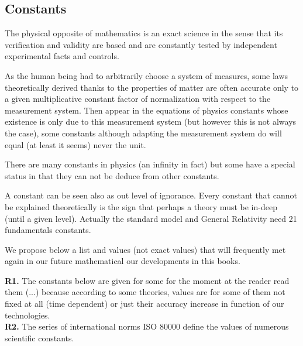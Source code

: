 	\subsection{Constants}
	The physical opposite of mathematics is an exact science in the sense that its verification and validity are based and are constantly tested by independent experimental facts and controls.

	As the human being had to arbitrarily choose a system of measures, some laws theoretically derived thanks to the properties of matter are often accurate only to a given multiplicative constant factor of normalization with respect to the measurement system. Then appear in the equations of physics constants whose existence is only due to this measurement system (but however this is not always the case), some constants although adapting the measurement system do will equal (at least it seems) never the unit.

	There are many constants in physics (an infinity in fact) but some have a special status in that they can not be deduce from other constants. 
	
	A constant can be seen also as out level of ignorance. Every constant that cannot be explained theoretically is the sign that perhaps a theory must be in-deep (until a given level). Actually the standard model and General Relativity need 21 fundamentals constants.
	
	We propose below a list and values (not exact values) that will frequently met again in our future mathematical our developments in this books.
	\begin{tcolorbox}[title=Remarks,colframe=black,arc=10pt]
	\textbf{R1.} The constants below are given for some for the moment at the reader read them (...) because according to some theories, values are for some of them not fixed at all (time dependent) or just their accuracy increase in function of our technologies.\\
	
	\textbf{R2.} The series of international norms ISO 80000 define the values of numerous scientific constants.
	\end{tcolorbox}
	
